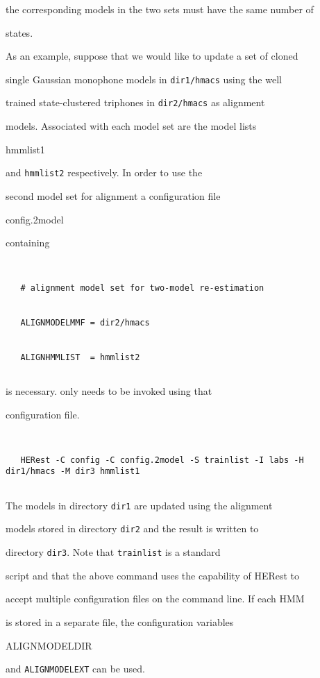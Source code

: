 the corresponding models in the two sets must have the same number of


states.





As an example, suppose that we would like to update a set of cloned


single Gaussian monophone models in {\tt dir1/hmacs} using the well


trained state-clustered triphones in {\tt dir2/hmacs} as alignment


models. Associated with each model set are the model lists {\tt


  hmmlist1} and {\tt hmmlist2} respectively. In order to use the


second model set for alignment a configuration file {\tt


  config.2model} containing


\begin{verbatim}


   # alignment model set for two-model re-estimation


   ALIGNMODELMMF = dir2/hmacs


   ALIGNHMMLIST  = hmmlist2


\end{verbatim}


is necessary.  only needs to be invoked using that


configuration file.


\begin{verbatim}


   HERest -C config -C config.2model -S trainlist -I labs -H dir1/hmacs -M dir3 hmmlist1


\end{verbatim}


The models in directory {\tt dir1} are updated using the alignment


models stored in directory {\tt dir2} and the result is written to


directory {\tt dir3}. Note that {\tt trainlist} is a standard \HTK\ 


script and that the above command uses the capability of HERest to


accept multiple configuration files on the command line. If each HMM


is stored in a separate file, the configuration variables {\tt


  ALIGNMODELDIR} and {\tt ALIGNMODELEXT} can be used.





